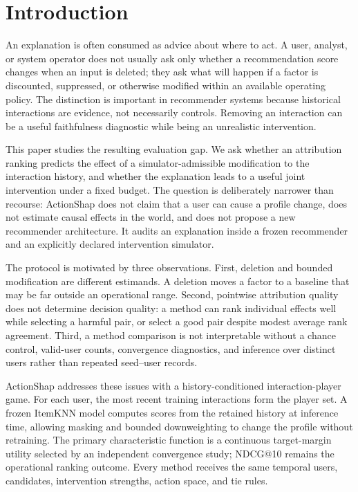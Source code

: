 \documentclass[pdflatex,sn-mathphys-num]{sn-jnl}
\begin{document}
\maketitle

\section{Introduction}
An explanation is often consumed as advice about where to act. A user, analyst, or system operator does not usually ask only whether a recommendation score changes when an input is deleted; they ask what will happen if a factor is discounted, suppressed, or otherwise modified within an available operating policy. The distinction is important in recommender systems because historical interactions are evidence, not necessarily controls. Removing an interaction can be a useful faithfulness diagnostic while being an unrealistic intervention.

This paper studies the resulting evaluation gap. We ask whether an attribution ranking predicts the effect of a simulator-admissible modification to the interaction history, and whether the explanation leads to a useful joint intervention under a fixed budget. The question is deliberately narrower than recourse: ActionShap does not claim that a user can cause a profile change, does not estimate causal effects in the world, and does not propose a new recommender architecture. It audits an explanation inside a frozen recommender and an explicitly declared intervention simulator.

The protocol is motivated by three observations. First, deletion and bounded modification are different estimands. A deletion moves a factor to a baseline that may be far outside an operational range. Second, pointwise attribution quality does not determine decision quality: a method can rank individual effects well while selecting a harmful pair, or select a good pair despite modest average rank agreement. Third, a method comparison is not interpretable without a chance control, valid-user counts, convergence diagnostics, and inference over distinct users rather than repeated seed--user records.

ActionShap addresses these issues with a history-conditioned interaction-player game. For each user, the most recent training interactions form the player set. A frozen ItemKNN model computes scores from the retained history at inference time, allowing masking and bounded downweighting to change the profile without retraining. The primary characteristic function is a continuous target-margin utility selected by an independent convergence study; NDCG@10 remains the operational ranking outcome. Every method receives the same temporal users, candidates, intervention strengths, action space, and tie rules.
\end{document}
